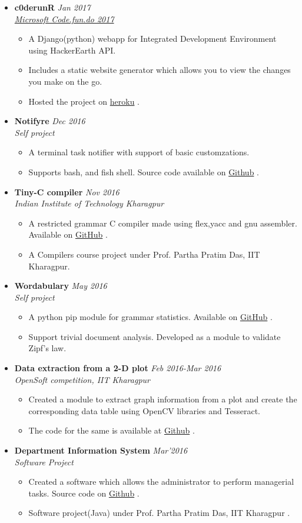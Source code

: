 \documentclass[10pt,a4paper]{moderncv}
\newcommand{\experience}[4]{
  \vspace{0.1cm}
  \item \textbf{\large{#1}} \hfill\textit{#3}\\\textit{#2}
  \begin{itemize}[leftmargin=*]
    \setlength\itemsep{0em} #4
  \end{itemize}
}
\newcommand{\project}[3]{
  \vspace{0.1cm}
  \item \textbf{\large{#1}} \hfill\textit{#2}\\\textit{Self project}
  \begin{itemize}[leftmargin=*]
    \setlength\itemsep{0em} #3
  \end{itemize}
}
\newcommand{\newlink}[2]{
  \href{#1}{\color{blue}#2}
}
\begin{document}
\begin{itemize}
  \experience{c0derunR}{\href{https://drive.google.com/open?id=0B5iU6cWw36rOOG9yZ2hxSTFTUEk}{Microsoft Code.fun.do 2017}}{Jan 2017}{
  	\item A Django(python) webapp for Integrated Development Environment using HackerEarth API.
  	\item Includes a static website generator which allows you to view the changes you make on the go.
  	\item Hosted the project on \newlink{http://c0derunr.herokuapp.com/}{heroku}.
  }

  \project{Notifyre}{Dec 2016}{
	\item A terminal task notifier with support of basic customzations. 
	\item Supports bash, and fish shell. Source code available on \newlink{https://github.com/kaustubhhiware/NotiFyre}{Github}.
  }
  
  \experience{Tiny-C compiler}{Indian Institute of Technology Kharagpur}{Nov 2016}{
  \item A restricted grammar C compiler made using flex,yacc and gnu assembler. Available on  \newlink{https://github.com/kaustubhhiware/cOMPILER}{GitHub}.
  \item A Compilers course project under Prof. Partha Pratim Das, IIT Kharagpur.
  }

  \project{Wordabulary}{May 2016}{
    \item A python pip module for grammar statistics. Available on \newlink{https://github.com/kaustubhhiware/Wordabulary}{GitHub}.
    \item Support trivial document analysis. Developed as a module to validate Zipf's law.
  }

  \experience{Data extraction from a 2-D plot}{OpenSoft competition, IIT Kharagpur}{Feb 2016-Mar 2016}{
  	\item Created a module to extract graph information from a plot and create the corresponding data table using OpenCV libraries and Tesseract.
  	\item The code for the same is available at \newlink{https://github.com/Azad-Hall/open-soft-2015-2016}{Github}.
  }

  \experience{Department Information System}{Software Project}{Mar'2016}{
  \item Created a software which allows the administrator to perform managerial tasks. Source code on \newlink{https://github.com/kaustubhhiware/DepInfosys}{Github}.
  \item Software project(Java) under Prof. Partha Pratim Das, IIT Kharagpur .
  }
\end{itemize}
\end{document}
